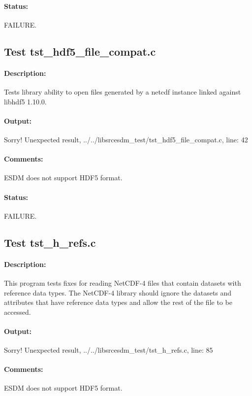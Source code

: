 \paragraph{Status:} FAILURE.

\subsection{Test tst\_hdf5\_file\_compat.c}

\paragraph{Description:} Tests library ability to open files generated by a netcdf instance linked against libhdf5 1.10.0.

\paragraph{Output:} Sorry! Unexpected result, ../../libsrcesdm\_test/tst\_hdf5\_file\_compat.c, line: 42

\paragraph{Comments:} ESDM does not support HDF5 format.

\paragraph{Status:} FAILURE.

\subsection{Test tst\_h\_refs.c}

\paragraph{Description:} This program tests fixes for reading NetCDF-4 files that contain datasets with reference data types.  The NetCDF-4 library should ignore the datasets and attributes that have reference data types and allow the rest of the file to be accessed.

\paragraph{Output:} Sorry! Unexpected result, ../../libsrcesdm\_test/tst\_h\_refs.c, line: 85

\paragraph{Comments:} ESDM does not support HDF5 format.

